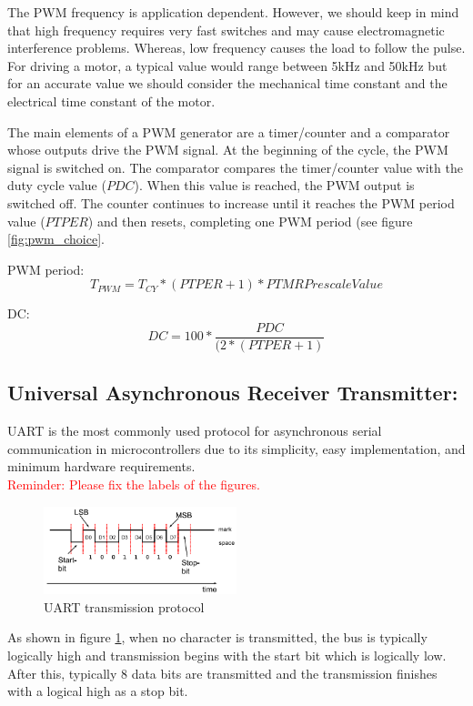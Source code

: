 The PWM frequency is application dependent. However, we should keep in mind that high frequency requires very fast switches and may cause electromagnetic interference problems. Whereas, low frequency causes the load to follow the pulse.\\
For driving a motor, a typical value would range between 5kHz and 50kHz but for an accurate value we should consider the mechanical time constant and the electrical time constant of the motor.


The main elements of a PWM generator are a timer/counter and a comparator whose outputs drive the PWM signal. At the beginning of the cycle, the PWM signal is switched on. The comparator compares the timer/counter value with the duty cycle value ($PDC$). When this value is reached, the PWM output is switched off. The counter continues to increase until it reaches the PWM period value ($PTPER$) and then resets, completing one PWM period (see figure \ref{fig:pwm_choice}.

PWM period:
$$T_{PWM}=T_{CY}*(PTPER+1)*PTMR Prescale Value$$

DC: 
$$DC=100* \frac{PDC}{(2*(PTPER+1)}$$


\subsection{Universal Asynchronous Receiver Transmitter:}

UART is the most commonly used protocol for asynchronous serial communication in microcontrollers due to its simplicity, easy implementation, and minimum hardware requirements.\\

\textcolor{red}{Reminder: Please fix the labels of the figures.}


\begin{figure}[H]
    \centering
    \includegraphics[width=0.5\textwidth]{figures/software/UART_com.PNG}
    \caption{UART transmission protocol\cite{alex}}
    \label{fig:uartProtocol}
\end{figure}

As shown in figure \ref{fig:uartProtocol}, when no character is transmitted, the bus is typically logically high and transmission begins with the start bit which is logically low. After this, typically 8 data bits are transmitted and the transmission finishes with a logical high as a stop bit.\\

